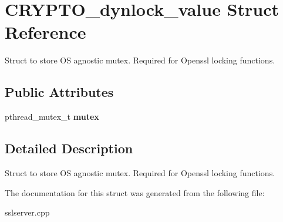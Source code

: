 \hypertarget{structCRYPTO__dynlock__value}{\section{C\-R\-Y\-P\-T\-O\-\_\-dynlock\-\_\-value Struct Reference}
\label{structCRYPTO__dynlock__value}
}


Struct to store O\-S agnostic mutex. Required for Openssl locking functions.  


\subsection*{Public Attributes}
\begin{DoxyCompactItemize}
\item 
\hypertarget{structCRYPTO__dynlock__value_aaa1fdfe8a25cbab8cbfa2196af97d968}{pthread\-\_\-mutex\-\_\-t {\bfseries mutex}}\label{structCRYPTO__dynlock__value_aaa1fdfe8a25cbab8cbfa2196af97d968}

\end{DoxyCompactItemize}


\subsection{Detailed Description}
Struct to store O\-S agnostic mutex. Required for Openssl locking functions. 

The documentation for this struct was generated from the following file\-:\begin{DoxyCompactItemize}
\item 
sslserver.\-cpp\end{DoxyCompactItemize}
